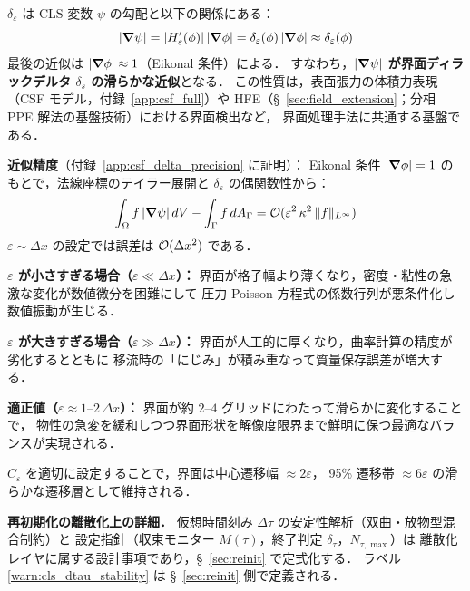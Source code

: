 $\delta_\varepsilon$ は CLS 変数 $\psi$ の勾配と以下の関係にある：
\begin{equation}
  |\bm{\nabla}\psi| = |H_\varepsilon'(\phi)|\,|\bm{\nabla}\phi|
               = \delta_\varepsilon(\phi)\,|\bm{\nabla}\phi|
               \approx \delta_\varepsilon(\phi)
  \label{eq:grad_psi_delta}
\end{equation}
最後の近似は $|\bm{\nabla}\phi|\approx 1$（Eikonal 条件）による．
すなわち，\textbf{$|\bm{\nabla}\psi|$ が界面ディラックデルタ $\delta_s$ の滑らかな近似}となる．
この性質は，表面張力の体積力表現（CSF モデル，付録~\ref{app:csf_full}）や
HFE（§~\ref{sec:field_extension}；分相 PPE 解法の基盤技術）における界面検出など，
界面処理手法に共通する基盤である．

\textbf{近似精度}（付録~\ref{app:csf_delta_precision} に証明）：
Eikonal 条件 $|\bm{\nabla}\phi|=1$ のもとで，法線座標のテイラー展開と
$\delta_\varepsilon$ の偶関数性から：
\[
  \int_\Omega f\,|\bm{\nabla}\psi|\,dV - \int_\Gamma f\,dA_\Gamma
  = \mathcal{O}(\varepsilon^2\,\kappa^2\,\|f\|_{L^\infty})
\]
$\varepsilon \sim \Delta x$ の設定では誤差は $\mathcal{O}(\Delta x^2)$ である．

\textbf{$\varepsilon$ が小さすぎる場合（$\varepsilon \ll \Delta x$）：}
界面が格子幅より薄くなり，密度・粘性の急激な変化が数値微分を困難にして
圧力 Poisson 方程式の係数行列が悪条件化し数値振動が生じる．

\textbf{$\varepsilon$ が大きすぎる場合（$\varepsilon \gg \Delta x$）：}
界面が人工的に厚くなり，曲率計算の精度が劣化するとともに
移流時の「にじみ」が積み重なって質量保存誤差が増大する．

\textbf{適正値（$\varepsilon \approx 1\text{--}2 \, \Delta x$）：}
界面が約 $2\text{--}4$ グリッドにわたって滑らかに変化することで，
物性の急変を緩和しつつ界面形状を解像度限界まで鮮明に保つ最適なバランスが実現される．

$C_\varepsilon$ を適切に設定することで，界面は中心遷移幅 $\approx 2\varepsilon$，
95\% 遷移帯 $\approx 6\varepsilon$ の滑らかな遷移層として維持される．

\medskip
\noindent\textbf{再初期化の離散化上の詳細．}
仮想時間刻み $\Delta\tau$ の安定性解析（双曲・放物型混合制約）と
設定指針（収束モニター $M(\tau)$，終了判定 $\delta_\tau$，$N_{\tau,\max}$）は
離散化レイヤに属する設計事項であり，§~\ref{sec:reinit} で定式化する．
ラベル \ref{warn:cls_dtau_stability} は §~\ref{sec:reinit} 側で定義される．
